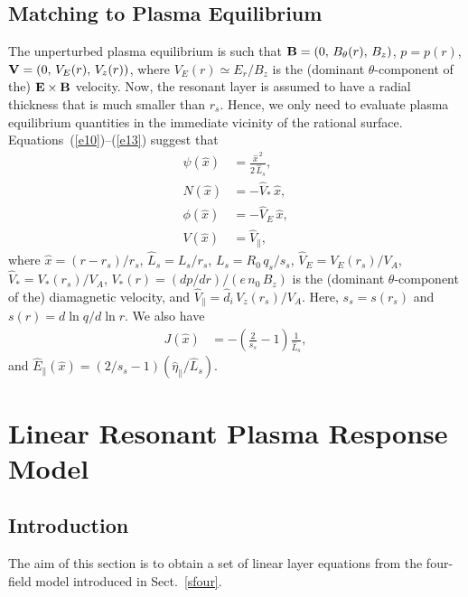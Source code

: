 \documentclass[12pt,prb,aps]{revtex4-1}
\begin{document}
\subsection{Matching to Plasma Equilibrium}
The unperturbed plasma equilibrium is such that
${\bf B} = (0,\,B_\theta(r),\,B_z)$,  $p = p(r)$,
${\bf V} = (0,\,V_E(r),\,V_z(r))$,
where 
$V_E(r)\simeq E_r/B_z$
 is the (dominant $\theta$-component of the) ${\bf E}\times {\bf B}$ velocity. Now, the resonant layer is assumed to have a radial thickness that is
much smaller than $r_s$.   Hence, we only need to evaluate plasma equilibrium quantities in the immediate vicinity of the rational
surface. Equations~(\ref{e10})--(\ref{e13}) suggest that 
\begin{align}
\psi(\hat{x})&= \frac{\hat{x}^{\,2}}{2\,\hat{L}_s},\label{e23}\\[0.5ex]
N(\hat{x}) &= -\hat{V}_\ast\,\hat{x},\\[0.5ex]
\phi(\hat{x}) &= - \hat{V}_E\,\hat{x},\\[0.5ex]
V (\hat{x})&= \hat{V}_\parallel,\label{e26}
\end{align}
where 
$\hat{x}=(r-r_s)/r_s$,
 $\hat{L}_s=L_s/r_s$,  $L_s=R_0\,q_s/s_s$, 
  $\hat{V}_E= V_E(r_s)/V_A$,
$\hat{V}_\ast= V_\ast(r_s)/V_A$,
$V_\ast(r) = (dp/dr)/(e\,n_0\,B_z)$ 
is the (dominant $\theta$-component of the) diamagnetic velocity,
  and 
 $\hat{V}_\parallel=\hat{d}_i\, V_z(r_s)/V_A$. Here, $s_s=s(r_s)$ and $s(r)=d\ln q/d\ln r$. We also have
 \begin{align}\label{e28}
 J (\hat{x})&= -\left(\frac{2}{s_s}-1\right)\frac{1}{\hat{L}_s},
\end{align} 
and $ \hat{E}_\parallel(\hat{x}) =(2/s_s-1) (\hat{\eta}_\parallel/\hat{L}_s)$.

\section{Linear Resonant Plasma Response Model}\label{layer}
\subsection{Introduction}
The aim of this section is to obtain a set of linear layer equations from the four-field model
introduced in Sect.~\ref{sfour}.
\end{document}
